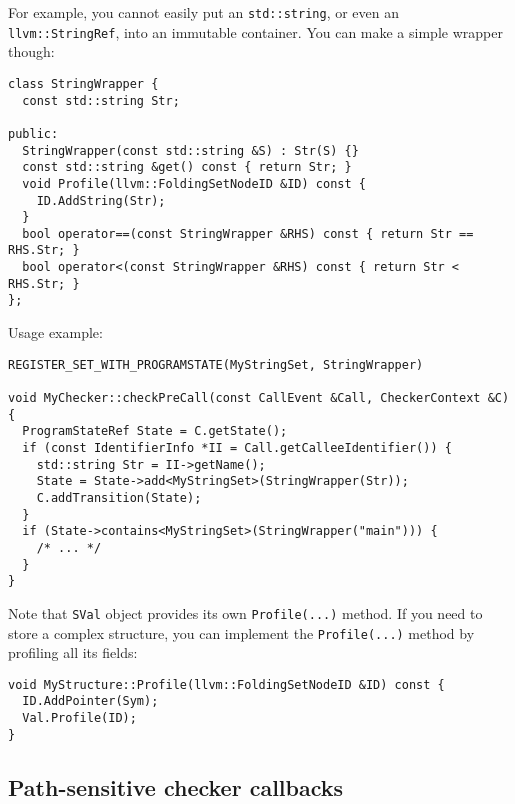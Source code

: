 \documentclass[a4paper,12pt]{article}
\newenvironment{nobr}{\begin{minipage}{\textwidth}\setlength\parskip{1em}
}{\end{minipage}\ignorespacesafterend}
\begin{document}
\begin{nobr}
For example, you cannot easily put an \lstinline|std::string|, or even an \lstinline|llvm::StringRef|, into an immutable container. You can make a simple wrapper though:

\begin{lstlisting}[style=cplusplus,numbers=none]
class StringWrapper {
  const std::string Str;

public:
  StringWrapper(const std::string &S) : Str(S) {}
  const std::string &get() const { return Str; }
  void Profile(llvm::FoldingSetNodeID &ID) const {
    ID.AddString(Str);
  }
  bool operator==(const StringWrapper &RHS) const { return Str == RHS.Str; }
  bool operator<(const StringWrapper &RHS) const { return Str < RHS.Str; }
};
\end{lstlisting}
\end{nobr}

\begin{nobr}
Usage example:

\begin{lstlisting}[style=cplusplus,numbers=none]
REGISTER_SET_WITH_PROGRAMSTATE(MyStringSet, StringWrapper)

void MyChecker::checkPreCall(const CallEvent &Call, CheckerContext &C) {
  ProgramStateRef State = C.getState();
  if (const IdentifierInfo *II = Call.getCalleeIdentifier()) {
    std::string Str = II->getName();
    State = State->add<MyStringSet>(StringWrapper(Str));
    C.addTransition(State);
  }
  if (State->contains<MyStringSet>(StringWrapper("main"))) {
    /* ... */
  }
}
\end{lstlisting}
\end{nobr}

\begin{nobr}
Note that \lstinline|SVal| object provides its own \lstinline|Profile(...)| method. If you need to store a complex structure, you can implement the \lstinline|Profile(...)| method by profiling all its fields:

\begin{lstlisting}[style=cplusplus,numbers=none]
void MyStructure::Profile(llvm::FoldingSetNodeID &ID) const {
  ID.AddPointer(Sym);
  Val.Profile(ID);
}
\end{lstlisting}
\end{nobr}

\subsection{Path-sensitive checker callbacks}\label{subsec:path_sensitive_callbacks}
\end{document}
